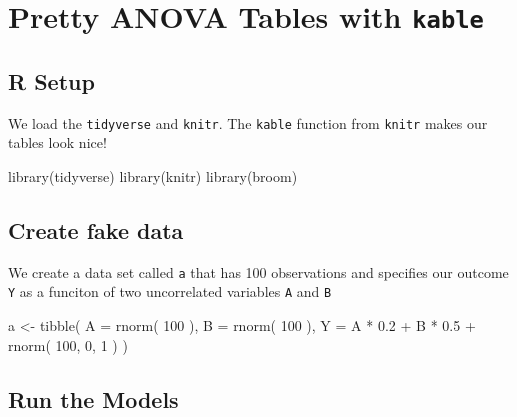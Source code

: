 \documentclass[
  letterpaper,
  DIV=11,
  numbers=noendperiod]{scrreprt}
\newenvironment{Shaded}{}{}
\newcommand{\AttributeTok}[1]{\textcolor[rgb]{0.49,0.56,0.16}{#1}}
\newcommand{\DecValTok}[1]{\textcolor[rgb]{0.25,0.63,0.44}{#1}}
\newcommand{\FloatTok}[1]{\textcolor[rgb]{0.25,0.63,0.44}{#1}}
\newcommand{\FunctionTok}[1]{\textcolor[rgb]{0.02,0.16,0.49}{#1}}
\newcommand{\NormalTok}[1]{#1}
\newcommand{\OtherTok}[1]{\textcolor[rgb]{0.00,0.44,0.13}{#1}}
\newcommand{\SpecialCharTok}[1]{\textcolor[rgb]{0.25,0.44,0.63}{#1}}
\begin{document}
\chapter{\texorpdfstring{Pretty ANOVA Tables with
\texttt{kable}}{Pretty ANOVA Tables with kable}}\label{pretty-anova-tables-with-kable}

\section{R Setup}\label{r-setup}

We load the \texttt{tidyverse} and \texttt{knitr}. The \texttt{kable}
function from \texttt{knitr} makes our tables look nice!

\begin{Shaded}
\begin{Highlighting}[]
\FunctionTok{library}\NormalTok{(tidyverse)}
\FunctionTok{library}\NormalTok{(knitr)}
\FunctionTok{library}\NormalTok{(broom)}
\end{Highlighting}
\end{Shaded}

\section{Create fake data}\label{create-fake-data}

We create a data set called \texttt{a} that has 100 observations and
specifies our outcome \texttt{Y} as a funciton of two uncorrelated
variables \texttt{A} and \texttt{B}

\begin{Shaded}
\begin{Highlighting}[]
\NormalTok{a }\OtherTok{\textless{}{-}} \FunctionTok{tibble}\NormalTok{( }\AttributeTok{A =} \FunctionTok{rnorm}\NormalTok{( }\DecValTok{100}\NormalTok{ ),}
            \AttributeTok{B =} \FunctionTok{rnorm}\NormalTok{( }\DecValTok{100}\NormalTok{ ),}
            \AttributeTok{Y =}\NormalTok{ A }\SpecialCharTok{*} \FloatTok{0.2} \SpecialCharTok{+}\NormalTok{ B }\SpecialCharTok{*} \FloatTok{0.5} \SpecialCharTok{+} \FunctionTok{rnorm}\NormalTok{( }\DecValTok{100}\NormalTok{, }\DecValTok{0}\NormalTok{, }\DecValTok{1}\NormalTok{ ) )}
\end{Highlighting}
\end{Shaded}

\section{Run the Models}\label{run-the-models}
\end{document}
